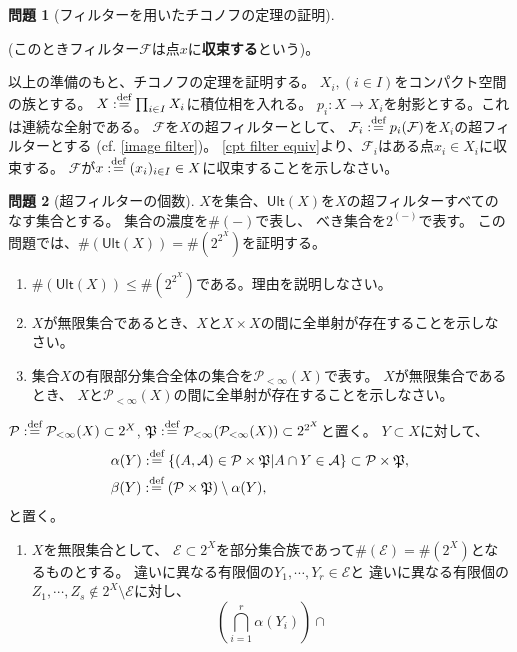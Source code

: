 \documentclass[uplatex]{jsarticle}
\theoremstyle{definition}
\newtheorem{prob}[prob]{問題}
\newcommand{\dfn}{:\overset{\mbox{{\scriptsize def}}}{=}}
\newcommand{\mcA}{\mathcal{A}}
\newcommand{\mcE}{\mathcal{E}}
\newcommand{\mcF}{\mathcal{F}}
\newcommand{\mcP}{\mathcal{P}}
\begin{document}
\begin{prob}[フィルターを用いたチコノフの定理の証明]
\begin{enumerate}
\begin{itemize}
      (このときフィルター\(\mcF\)は点\(x\)に\textbf{収束する}という)。
    \end{itemize}
  \end{enumerate}
  以上の準備のもと、チコノフの定理を証明する。
  \(X_i, (i\in I)\)をコンパクト空間の族とする。
  \(X\dfn \prod_{i\in I}X_i\)に積位相を入れる。
  \(p_i:X\to X_i\)を射影とする。これは連続な全射である。
  \(\mcF\)を\(X\)の超フィルターとして、
  \(\mcF_i\dfn p_i(\mcF)\)を\(X_i\)の超フィルターとする (cf. \ref{image filter})。
  \ref{cpt filter equiv}より、\(\mcF_i\)はある点\(x_i\in X_i\)に収束する。
  \(\mcF\)が\(x\dfn (x_i)_{i\in I}\in X\)に収束することを示しなさい。
\end{prob}




\begin{prob}[超フィルターの個数]\label{cardinality of ultra filters}
  \(X\)を集合、\(\mathsf{Ult}(X)\)を\(X\)の超フィルターすべてのなす集合とする。
  集合の濃度を\(\#(-)\)で表し、
  べき集合を\(2^{(-)}\)で表す。
  この問題では、\(\#(\mathsf{Ult}(X)) = \#(2^{2^X})\)を証明する。
  \begin{enumerate}
    \item
    \(\#(\mathsf{Ult}(X)) \leq \#(2^{2^X})\)である。理由を説明しなさい。
    \item
    \(X\)が無限集合であるとき、\(X\)と\(X\times X\)の間に全単射が存在することを示しなさい。
    \item
    集合\(X\)の有限部分集合全体の集合を\(\mcP_{<\infty}(X)\)で表す。
    \(X\)が無限集合であるとき、
    \(X\)と\(\mcP_{<\infty}(X)\)の間に全単射が存在することを示しなさい。
  \end{enumerate}
  \(\mcP\dfn \mcP_{<\infty}(X) \subset 2^X\),
  \(\mathfrak{P}\dfn \mcP_{<\infty}(\mcP_{<\infty}(X))\subset 2^{2^X}\)と置く。
  \(Y\subset X\)に対して、
  \begin{align*}
    &\alpha(Y) \dfn \{(A,\mcA)\in \mcP\times \mathfrak{P} | A\cap Y\in \mcA\}
    \subset \mcP \times \mathfrak{P}, \\
    &\beta(Y) \dfn (\mcP \times \mathfrak{P}) \setminus \alpha(Y),
  \end{align*}
  と置く。
  \begin{enumerate}[start=3]
    \item
    \(X\)を無限集合として、
    \(\mcE \subset 2^X\)を部分集合族であって\(\#(\mcE) = \#(2^X)\)となるものとする。
    違いに異なる有限個の\(Y_1,\cdots, Y_r\in \mcE\)と
    違いに異なる有限個の\(Z_1,\cdots, Z_s\not\in 2^X\setminus \mcE\)に対し、
    \[
    \left( \bigcap_{i=1}^r \alpha(Y_i)\right) \cap
\]
\end{enumerate}
\end{prob}
\end{document}
